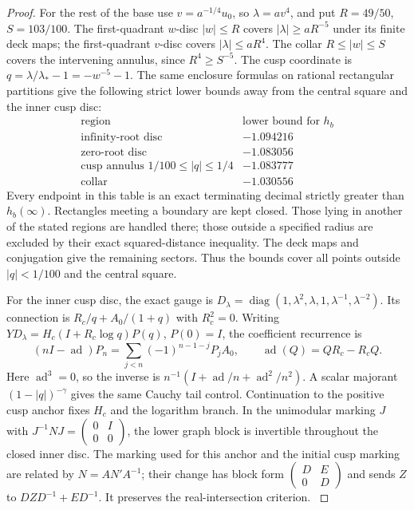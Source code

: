 \documentclass[11pt,a4paper]{article}
\numberwithin{equation}{section}
\theoremstyle{definition}
\begin{document}
\begin{proof}
For the rest of the base use $v=a^{-1/4}u_0$, so
$\lambda=av^4$, and put $R=49/50$, $S=103/100$.
The first-quadrant $w$-disc $|w|\le R$ covers
$|\lambda|\ge aR^{-5}$ under its finite deck maps; the
first-quadrant $v$-disc covers $|\lambda|\le aR^4$.
The collar $R\le|w|\le S$ covers the intervening annulus,
since $R^4\ge S^{-5}$.
The cusp coordinate is $q=\lambda/\lambda_*-1=-w^{-5}-1$.
The same enclosure formulas on rational rectangular partitions
give the following strict lower bounds away from the central
square and the inner cusp disc:
\[
\begin{array}{c|c}
\text{region}&\text{lower bound for }h_b\\\hline
\text{infinity-root disc}&-1.094216\\
\text{zero-root disc}&-1.083056\\
\text{cusp annulus }1/100\le|q|\le1/4&-1.083777\\
\text{collar}&-1.030556
\end{array}
\]
Every endpoint in this table is an exact terminating decimal
strictly greater than $h_b(\infty)$. Rectangles meeting a
boundary are kept closed. Those lying in another of the stated
regions are handled there; those outside a specified radius are
excluded by their exact squared-distance inequality. The deck
maps and conjugation give the remaining sectors. Thus the
bounds cover all points outside $|q|<1/100$ and the central
square.

For the inner cusp disc, the exact gauge is
$D_\lambda=\operatorname{diag}(1,\lambda^2,\lambda,1,\lambda^{-1},\lambda^{-2})$.
Its connection is $R_c/q+A_0/(1+q)$ with $R_c^2=0$.
Writing $YD_\lambda=H_c(I+R_c\log q)P(q)$, $P(0)=I$,
the coefficient recurrence is
\[
 (nI-\operatorname{ad})P_n
 =\sum_{j<n}(-1)^{n-1-j}P_jA_0,
 \qquad\operatorname{ad}(Q)=QR_c-R_cQ.
\]
Here $\operatorname{ad}^3=0$, so the inverse is
$n^{-1}(I+\operatorname{ad}/n+\operatorname{ad}^2/n^2)$.
A scalar majorant $(1-|q|)^{-\gamma}$ gives the same
Cauchy tail control. Continuation to the positive cusp anchor
fixes $H_c$ and the logarithm branch. In the unimodular marking
$J$ with $J^{-1}NJ=\left(\begin{smallmatrix}0&I\\0&0\end{smallmatrix}\right)$,
the lower graph block is invertible throughout the closed
inner disc. The marking used for this anchor and the initial
cusp marking are related by $N=AN'A^{-1}$; their change has
block form $\left(\begin{smallmatrix}D&E\\0&D\end{smallmatrix}\right)$
and sends $Z$ to $DZD^{-1}+ED^{-1}$. It preserves the
real-intersection criterion.
\hypertarget{tag-03L0}{}\label{layout:V:fresh-marking}


\end{proof}
\end{document}

